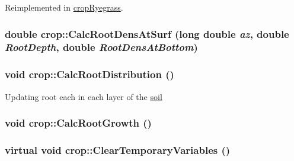 Reimplemented in \hyperlink{classcrop_ryegrass_a573d23b1d622e156001cae5c45203bc0}{cropRyegrass}.\hypertarget{classcrop_a50355c2424f5c5f1a7bfc1b8f91c500f}{
\subsubsection[{CalcRootDensAtSurf}]{\setlength{\rightskip}{0pt plus 5cm}double crop::CalcRootDensAtSurf (long double {\em az}, \/  double {\em RootDepth}, \/  double {\em RootDensAtBottom})}}
\label{classcrop_a50355c2424f5c5f1a7bfc1b8f91c500f}
\hypertarget{classcrop_a84819af6b3132d798a56acd9c78dfbe1}{
\subsubsection[{CalcRootDistribution}]{\setlength{\rightskip}{0pt plus 5cm}void crop::CalcRootDistribution ()}}
\label{classcrop_a84819af6b3132d798a56acd9c78dfbe1}
Updating root each in each layer of the \hyperlink{classsoil}{soil} \hypertarget{classcrop_a022c14d2c183c8d21c622c225bb763d8}{
\subsubsection[{CalcRootGrowth}]{\setlength{\rightskip}{0pt plus 5cm}void crop::CalcRootGrowth ()}}
\label{classcrop_a022c14d2c183c8d21c622c225bb763d8}
\hypertarget{classcrop_ac113e2ac847afe0da1d72cad7faf4c5f}{
\subsubsection[{ClearTemporaryVariables}]{\setlength{\rightskip}{0pt plus 5cm}virtual void crop::ClearTemporaryVariables ()}}
\label{classcrop_ac113e2ac847afe0da1d72cad7faf4c5f}


